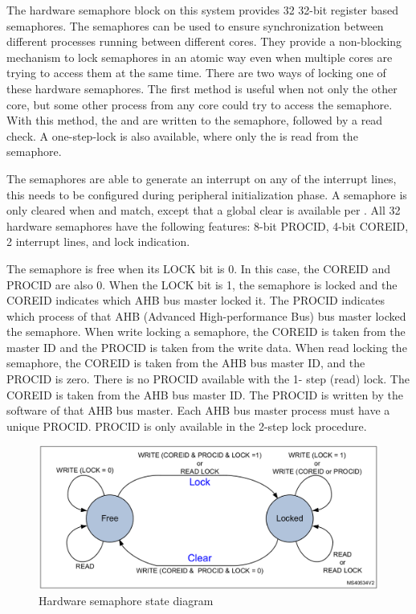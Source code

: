 The hardware semaphore block on this system provides 32 32-bit register based semaphores. The semaphores can be used to ensure synchronization between different processes running between different cores. They provide a non-blocking mechanism to lock semaphores in an atomic way even when multiple cores are trying to access them at the same time. There are two ways of locking one of these hardware semaphores. The first method is useful when not only the other core, but some other process from any core could try to access the semaphore. With this method, the  and  are written to the semaphore, followed by a read check. A one-step-lock is also available, where only the  is read from the semaphore.

The semaphores are able to generate an interrupt on any of the interrupt lines, this needs to be configured during peripheral initialization phase. A semaphore is only cleared when  and  match, except that a global clear is available per . All 32 hardware semaphores have the following features: 8-bit PROCID, 4-bit COREID, 2 interrupt lines, and lock indication.

The semaphore is free when its LOCK bit is 0. In this case, the COREID and PROCID are also 0. When the LOCK bit is 1, the semaphore is locked and the COREID indicates which AHB bus master locked it. The PROCID indicates which process of that AHB (Advanced High-performance Bus) bus master locked the semaphore. When write locking a semaphore, the COREID is taken from the master ID and the PROCID is taken from the write data. When read locking the semaphore, the COREID is taken from the AHB bus master ID, and the PROCID is zero. There is no PROCID available with the 1- step (read) lock. The COREID is taken from the AHB bus master ID. The PROCID is written by the software of that AHB bus master. Each AHB bus master process must have a unique PROCID. PROCID is only available in the 2-step lock procedure.

\begin{figure}[!ht]
    \centering
    \includegraphics[width=150mm, keepaspectratio]{figures/hw-semaphore.png}
    \caption{Hardware semaphore state diagram \cite{HWSemaphore}}
    \label{fig:HWSemaphore}
\end{figure}

